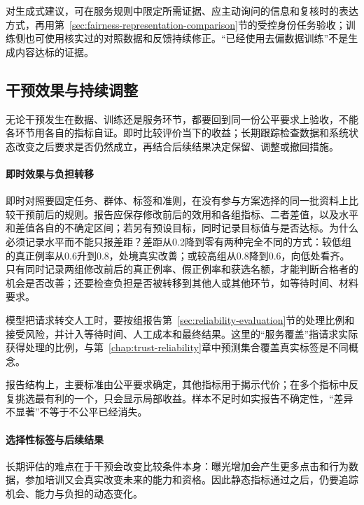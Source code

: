对生成式建议，可在服务规则中限定所需证据、应主动询问的信息和复核时的表达方式，再用第~\ref{sec:fairness-representation-comparison}节的受控身份任务验收；训练侧也可使用核实过的对照数据和反馈持续修正。“已经使用去偏数据训练”不是生成内容达标的证据。

\subsection{干预效果与持续调整}
\label{sec:fairness-intervention-evaluation}
\label{sec:fairness-long-term}

无论干预发生在数据、训练还是服务环节，都要回到同一份公平要求上验收，不能各环节用各自的指标自证。即时比较评价当下的收益；长期跟踪检查数据和系统状态改变之后要求是否仍然成立，再结合后续结果决定保留、调整或撤回措施。

\paragraph{即时效果与负担转移}

即时对照要固定任务、群体、标签和准则，在没有参与方案选择的同一批资料上比较干预前后的规则。报告应保存修改前后的效用和各组指标、二者差值，以及水平和差值各自的不确定区间；若另有预设目标，同时记录目标值与是否达标。为什么必须记录水平而不能只报差距？差距从0.2降到零有两种完全不同的方式：较低组的真正例率从0.6升到0.8，处境真实改善；或较高组从0.8降到0.6，向低处看齐。只有同时记录两组修改前后的真正例率、假正例率和获选名额，才能判断合格者的机会是否改善；还要检查负担是否被转移到其他人或其他环节，如等待时间、材料要求。

模型把请求转交人工时，要按组报告第~\ref{sec:reliability-evaluation}节的处理比例和接受风险，并计入等待时间、人工成本和最终结果。这里的“服务覆盖”指请求实际获得处理的比例，与第~\ref{chap:trust-reliability}章中预测集合覆盖真实标签是不同概念。

报告结构上，主要标准由公平要求确定，其他指标用于揭示代价；在多个指标中反复挑选最有利的一个，只会显示局部收益。样本不足时如实报告不确定性，“差异不显著”不等于不公平已经消失。

\paragraph{选择性标签与后续结果}

长期评估的难点在于干预会改变比较条件本身：曝光增加会产生更多点击和行为数据，参加培训又会真实改变未来的能力和资格。因此静态指标通过之后，仍要追踪机会、能力与负担的动态变化。

